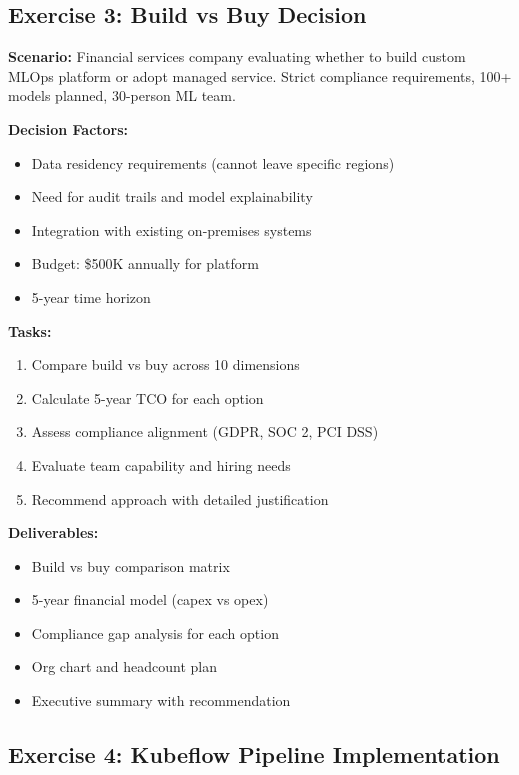 \subsection{Exercise 3: Build vs Buy Decision}

\textbf{Scenario:} Financial services company evaluating whether to build custom MLOps platform or adopt managed service. Strict compliance requirements, 100+ models planned, 30-person ML team.

\textbf{Decision Factors:}
\begin{itemize}
    \item Data residency requirements (cannot leave specific regions)
    \item Need for audit trails and model explainability
    \item Integration with existing on-premises systems
    \item Budget: \$500K annually for platform
    \item 5-year time horizon
\end{itemize}

\textbf{Tasks:}
\begin{enumerate}
    \item Compare build vs buy across 10 dimensions
    \item Calculate 5-year TCO for each option
    \item Assess compliance alignment (GDPR, SOC 2, PCI DSS)
    \item Evaluate team capability and hiring needs
    \item Recommend approach with detailed justification
\end{enumerate}

\textbf{Deliverables:}
\begin{itemize}
    \item Build vs buy comparison matrix
    \item 5-year financial model (capex vs opex)
    \item Compliance gap analysis for each option
    \item Org chart and headcount plan
    \item Executive summary with recommendation
\end{itemize}

\subsection{Exercise 4: Kubeflow Pipeline Implementation}

